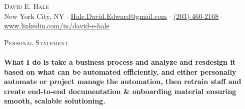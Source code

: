 \documentclass[a4paper]{article}
\newcommand{\lineunder} {
    \vspace*{-8pt} \\
    \hspace*{-18pt} \hrulefill \\
}
\newcommand{\header} [1] {
    {\hspace*{-18pt}\vspace*{6pt} \textsc{#1}}
    \vspace*{-6pt} \lineunder
}
\begin{document}
\vspace*{-40pt}

    

\vspace*{-9pt}
\begin{center}
	{\Large \scshape {David E. Hale}}\\
	New York City, NY $\cdot$ \href{mailto:Hale.David.Edward@gmail.com}{Hale.David.Edward@gmail.com} $\cdot$ \href{tel:203-460-2168}{(203)-460-2168} $\cdot$ \href{www.linkedin.com/in/david-e-hale}{www.linkedin.com/in/david-e-hale}
\end{center}

\header{Personal Statement}
\vspace{1mm}
\textbf{What I do is take a business process and analyze and resdesign it based on what can be automated efficiently, and either personally automate or project manage the automation,
        then retrain staff and create end-to-end documentation \& onboarding material ensuring smooth, scalable solutioning.
}
\end{document}
